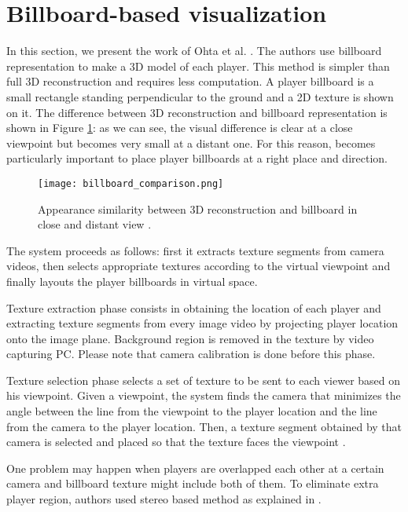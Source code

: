 \section{Billboard-based visualization}
In this section, we present the work of Ohta et al. \cite{03_billboard}.
The authors use billboard representation to make a 3D model of each player.
This method is simpler than full 3D reconstruction and requires less computation.
A player billboard is a small rectangle standing perpendicular to the ground
and a 2D texture is shown on it.
The difference between 3D reconstruction and billboard representation is shown in Figure \ref{fig:billboard_comparison}:
as we can see, the visual difference is clear at a close viewpoint but becomes very small at a distant one.
For this reason, becomes particularly important to place player billboards at a right place and direction.

\begin{figure}[htbp]
\centerline{\texttt{[image: billboard\_comparison.png]}}
\caption{Appearance similarity between 3D reconstruction and billboard in close and distant view \cite{03_billboard}.}
\label{fig:billboard_comparison}
\end{figure}


The system proceeds as follows: first it extracts texture segments from camera videos, then selects appropriate textures according
to the virtual viewpoint and finally layouts the player billboards in virtual space.

Texture extraction phase consists in obtaining the location of each player and extracting texture segments from every image 
video by projecting player location onto the image plane.
Background region is removed in the texture by video capturing PC.
Please note that camera calibration is done before this phase.

Texture selection phase selects a set of texture to be sent to each viewer based on his viewpoint. 
Given a viewpoint, the system finds the camera that minimizes the angle between the line from the viewpoint to the player 
location and the line from the camera to the player location. Then, a texture segment obtained by that camera is selected 
and placed so that the texture faces the viewpoint \cite{03_billboard}.


One problem may happen when players are overlapped each other at a certain camera and billboard texture might include both
of them.
To eliminate extra player region, authors used stereo based method \cite{03_billboard_04} as explained in \cite{03_billboard}. 

